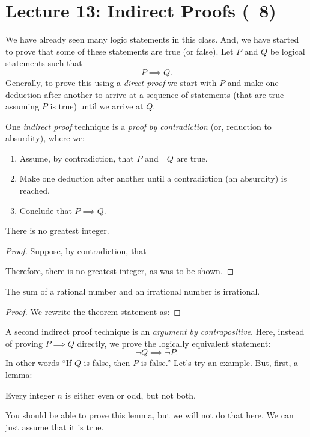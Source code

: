 \section*{Lecture 13: Indirect Proofs (--8)}

We have already seen many logic statements in this class.  And, we have started
to prove that some of these statements are true (or false).  Let $P$ and $Q$ be
logical statements such that
$$ P \implies Q.$$
Generally, to prove this using a \emph{direct proof} we start with $P$ and make
one deduction after another to arrive at a sequence of statements (that are true
assuming $P$ is true) until we arrive at $Q$.

One \emph{indirect proof} technique is a \emph{proof by contradiction}  (or,
reduction to absurdity), where
we:
\begin{enumerate}
    \item Assume, by contradiction, that $P$ and $\neg Q$ are true.
    \item Make one deduction after another until a contradiction (an absurdity) is reached.
    \item Conclude that $P \implies Q$.
\end{enumerate}

\begin{theorem}
    There is no greatest integer.
\end{theorem}
\begin{proof}
    Suppose, by contradiction, that

    \proofspace
    Therefore, there is no greatest integer, as was to be shown.
\end{proof}

\begin{theorem}
    The sum of a rational number and an irrational number is irrational.
\end{theorem}
\begin{proof}
    We rewrite the theorem statement as:

    \proofspace
\end{proof}

\pagebreak
A second indirect proof technique is an \emph{argument by contrapositive}.
Here, instead of proving $P \implies Q$ directly, we prove the logically
equivalent statement:
$$ \neg Q \implies \neg P. $$
In other words ``If $Q$ is false, then $P$ is false.''
Let's try an example.  But, first, a lemma:

\begin{lemma}
    Every integer $n$ is either even or odd, but not both.
\end{lemma}
You should be able to prove this lemma, but we will not do that here.  We can
just assume that it is true.

